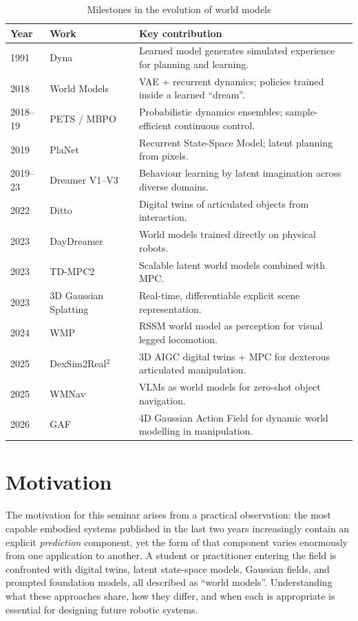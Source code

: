 \documentclass[12pt,a4paper,final]{extreport}
\begin{document}
{\renewcommand{\arraystretch}{1.2}
\begin{table}[htbp]
\centering
\caption{Milestones in the evolution of world models}\label{tab:evolution}
\small
\begin{tabularx}{\textwidth}{|p{1.2cm}|p{3.6cm}|X|}
\hline
\textbf{Year} & \textbf{Work} & \textbf{Key contribution} \\ \hline
1991 & Dyna & Learned model generates simulated experience for planning and learning. \\ \hline
2018 & World Models & VAE + recurrent dynamics; policies trained inside a learned ``dream''. \\ \hline
2018--19 & PETS / MBPO & Probabilistic dynamics ensembles; sample-efficient continuous control. \\ \hline
2019 & PlaNet & Recurrent State-Space Model; latent planning from pixels. \\ \hline
2019--23 & Dreamer V1--V3 & Behaviour learning by latent imagination across diverse domains. \\ \hline
2022 & Ditto & Digital twins of articulated objects from interaction. \\ \hline
2023 & DayDreamer & World models trained directly on physical robots. \\ \hline
2023 & TD-MPC2 & Scalable latent world models combined with MPC. \\ \hline
2023 & 3D Gaussian Splatting & Real-time, differentiable explicit scene representation. \\ \hline
2024 & WMP \cite{p3} & RSSM world model as perception for visual legged locomotion. \\ \hline
2025 & DexSim2Real$^2$ \cite{p1} & 3D AIGC digital twins + MPC for dexterous articulated manipulation. \\ \hline
2025 & WMNav \cite{p4} & VLMs as world models for zero-shot object navigation. \\ \hline
2026 & GAF \cite{p2} & 4D Gaussian Action Field for dynamic world modelling in manipulation. \\ \hline
\end{tabularx}
\end{table}}

\section{Motivation}

\paragraph{} The motivation for this seminar arises from a practical observation: the most capable embodied systems published in the last two years increasingly contain an explicit \emph{prediction} component, yet the form of that component varies enormously from one application to another. A student or practitioner entering the field is confronted with digital twins, latent state-space models, Gaussian fields, and prompted foundation models, all described as ``world models''. Understanding what these approaches share, how they differ, and when each is appropriate is essential for designing future robotic systems.
\end{document}
